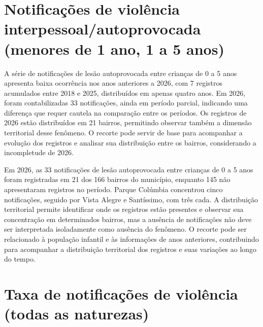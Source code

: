 \section{Notificações de violência interpessoal/\allowbreak{}autoprovocada (menores de 1 ano, 1 a 5 anos)}


A série de notificações de lesão autoprovocada entre crianças de 0 a 5 anos apresenta baixa ocorrência nos anos anteriores a 2026, com 7 registros acumulados entre 2018 e 2025, distribuídos em apenas quatro anos. Em 2026, foram contabilizadas 33 notificações, ainda em período parcial, indicando uma diferença que requer cautela na comparação entre os períodos. Os registros de 2026 estão distribuídos em 21 bairros, permitindo observar também a dimensão territorial desse fenômeno. O recorte pode servir de base para acompanhar a evolução dos registros e analisar sua distribuição entre os bairros, considerando a incompletude de 2026.


Em 2026, as 33 notificações de lesão autoprovocada entre crianças de 0 a 5 anos foram registradas em 21 dos 166 bairros do município, enquanto 145 não apresentaram registros no período. Parque Colúmbia concentrou cinco notificações, seguido por Vista Alegre e Santíssimo, com três cada. A distribuição territorial permite identificar onde os registros estão presentes e observar sua concentração em determinados bairros, mas a ausência de notificações não deve ser interpretada isoladamente como ausência do fenômeno. O recorte pode ser relacionado à população infantil e às informações de anos anteriores, contribuindo para acompanhar a distribuição territorial dos registros e suas variações ao longo do tempo.


\section{Taxa de notificações de violência (todas as naturezas)}

